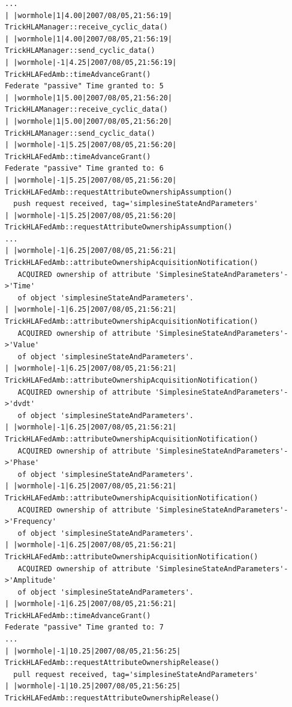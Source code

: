 \begin{lstlisting}[numbers=none,caption={Output stream from the passive ownerhsip transfer simulation}]
...
| |wormhole|1|4.00|2007/08/05,21:56:19| TrickHLAManager::receive_cyclic_data()
| |wormhole|1|4.00|2007/08/05,21:56:19| TrickHLAManager::send_cyclic_data()
| |wormhole|-1|4.25|2007/08/05,21:56:19| TrickHLAFedAmb::timeAdvanceGrant()
Federate "passive" Time granted to: 5
| |wormhole|1|5.00|2007/08/05,21:56:20| TrickHLAManager::receive_cyclic_data()
| |wormhole|1|5.00|2007/08/05,21:56:20| TrickHLAManager::send_cyclic_data()
| |wormhole|-1|5.25|2007/08/05,21:56:20| TrickHLAFedAmb::timeAdvanceGrant()
Federate "passive" Time granted to: 6
| |wormhole|-1|5.25|2007/08/05,21:56:20| TrickHLAFedAmb::requestAttributeOwnershipAssumption()
  push request received, tag='simplesineStateAndParameters'
| |wormhole|-1|5.25|2007/08/05,21:56:20| TrickHLAFedAmb::requestAttributeOwnershipAssumption()
...
| |wormhole|-1|6.25|2007/08/05,21:56:21| TrickHLAFedAmb::attributeOwnershipAcquisitionNotification()
   ACQUIRED ownership of attribute 'SimplesineStateAndParameters'->'Time'
   of object 'simplesineStateAndParameters'.
| |wormhole|-1|6.25|2007/08/05,21:56:21| TrickHLAFedAmb::attributeOwnershipAcquisitionNotification()
   ACQUIRED ownership of attribute 'SimplesineStateAndParameters'->'Value'
   of object 'simplesineStateAndParameters'.
| |wormhole|-1|6.25|2007/08/05,21:56:21| TrickHLAFedAmb::attributeOwnershipAcquisitionNotification()
   ACQUIRED ownership of attribute 'SimplesineStateAndParameters'->'dvdt'
   of object 'simplesineStateAndParameters'.
| |wormhole|-1|6.25|2007/08/05,21:56:21| TrickHLAFedAmb::attributeOwnershipAcquisitionNotification()
   ACQUIRED ownership of attribute 'SimplesineStateAndParameters'->'Phase'
   of object 'simplesineStateAndParameters'.
| |wormhole|-1|6.25|2007/08/05,21:56:21| TrickHLAFedAmb::attributeOwnershipAcquisitionNotification()
   ACQUIRED ownership of attribute 'SimplesineStateAndParameters'->'Frequency'
   of object 'simplesineStateAndParameters'.
| |wormhole|-1|6.25|2007/08/05,21:56:21| TrickHLAFedAmb::attributeOwnershipAcquisitionNotification()
   ACQUIRED ownership of attribute 'SimplesineStateAndParameters'->'Amplitude'
   of object 'simplesineStateAndParameters'.
| |wormhole|-1|6.25|2007/08/05,21:56:21| TrickHLAFedAmb::timeAdvanceGrant()
Federate "passive" Time granted to: 7
...
| |wormhole|-1|10.25|2007/08/05,21:56:25| TrickHLAFedAmb::requestAttributeOwnershipRelease()
  pull request received, tag='simplesineStateAndParameters'
| |wormhole|-1|10.25|2007/08/05,21:56:25| TrickHLAFedAmb::requestAttributeOwnershipRelease()

\end{lstlisting}
